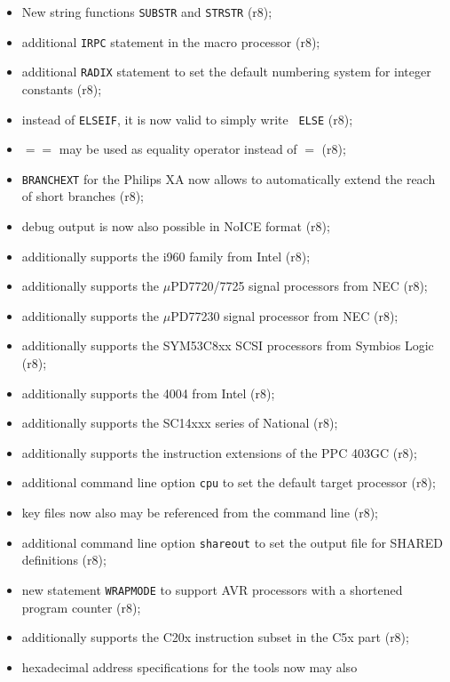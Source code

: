\documentclass[12pt,twoside]{report}
\newcommand{\tty}[1]{{\tt #1}}
\begin{document}
\begin{itemize}
{\begin{itemize}
{            (r8);}
      \item{New string functions \tty{SUBSTR} and \tty{STRSTR} (r8);}
      \item{additional \tty{IRPC} statement in the macro processor (r8);}
      \item{additional \tty{RADIX} statement to set the default numbering
            system for integer constants (r8);}
      \item{instead of {\tt ELSEIF}, it is now valid to simply write {\tt
            ELSE} (r8);}
      \item{$==$ may be used as equality operator instead of $=$ (r8);}
      \item{\tty{BRANCHEXT} for the Philips XA now allows to automatically 
            extend the reach of short branches (r8);}
      \item{debug output is now also possible in NoICE format (r8);}
      \item{additionally supports the i960 family from Intel (r8);}
      \item{additionally supports the $\mu$PD7720/7725 signal processors
            from NEC (r8);}
      \item{additionally supports the $\mu$PD77230 signal processor from
            NEC (r8);}
      \item{additionally supports the SYM53C8xx SCSI processors from
            Symbios Logic (r8);}
      \item{additionally supports the 4004 from Intel (r8);}
      \item{additionally supports the SC14xxx series of National (r8);}
      \item{additionally supports the instruction extensions of the PPC
            403GC (r8);}
      \item{additional command line option {\tt cpu} to set the default
            target processor (r8);}
      \item{key files now also may be referenced from the command line
            (r8);}
      \item{additional command line option {\tt shareout} to set the
            output file for SHARED definitions (r8);}
      \item{new statement {\tt WRAPMODE} to support AVR processors with 
            a shortened program counter (r8);}
      \item{additionally supports the C20x instruction subset in the C5x
            part (r8);}
      \item{hexadecimal address specifications for the tools now may also
}
\end{itemize}}
\end{itemize}
\end{document}
